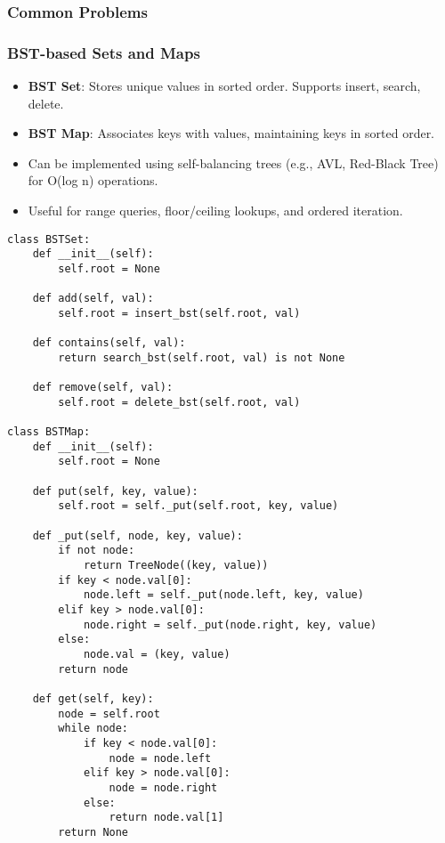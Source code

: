 \subsubsection{Common Problems}

\begin{summary}
\end{summary}

\newpage

\subsubsection{BST-based Sets and Maps}

\begin{summary}
    \begin{itemize}
        \item \textbf{BST Set}: Stores unique values in sorted order. Supports insert, search, delete.
        \item \textbf{BST Map}: Associates keys with values, maintaining keys in sorted order.
        \item Can be implemented using self-balancing trees (e.g., AVL, Red-Black Tree) for O(log n) operations.
        \item Useful for range queries, floor/ceiling lookups, and ordered iteration.
    \end{itemize}
\end{summary}

\begin{algo}
\begin{lstlisting}
class BSTSet:
    def __init__(self):
        self.root = None

    def add(self, val):
        self.root = insert_bst(self.root, val)

    def contains(self, val):
        return search_bst(self.root, val) is not None

    def remove(self, val):
        self.root = delete_bst(self.root, val)

class BSTMap:
    def __init__(self):
        self.root = None

    def put(self, key, value):
        self.root = self._put(self.root, key, value)

    def _put(self, node, key, value):
        if not node:
            return TreeNode((key, value))
        if key < node.val[0]:
            node.left = self._put(node.left, key, value)
        elif key > node.val[0]:
            node.right = self._put(node.right, key, value)
        else:
            node.val = (key, value)
        return node

    def get(self, key):
        node = self.root
        while node:
            if key < node.val[0]:
                node = node.left
            elif key > node.val[0]:
                node = node.right
            else:
                return node.val[1]
        return None
\end{lstlisting}
\end{algo}

